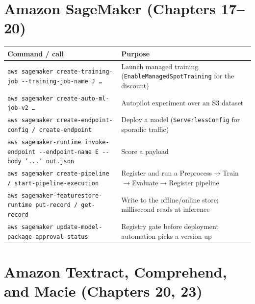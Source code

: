 \section{Amazon SageMaker (Chapters 17--20)}
%

\begin{center}
\footnotesize
\begin{tabular}{@{}p{7.2cm}p{7.6cm}@{}}
\toprule
\textbf{Command / call} & \textbf{Purpose} \\
\midrule
\texttt{aws sagemaker create-training-job -{}-training-job-name J \dots} & Launch managed training (\texttt{EnableManagedSpotTraining} for the discount) \\
\texttt{aws sagemaker create-auto-ml-job-v2 \dots} & Autopilot experiment over an S3 dataset \\
\texttt{aws sagemaker create-endpoint-config / create-endpoint} & Deploy a model (\texttt{ServerlessConfig} for sporadic traffic) \\
\texttt{aws sagemaker-runtime invoke-endpoint -{}-endpoint-name E -{}-body '{...}' out.json} & Score a payload \\
\texttt{aws sagemaker create-pipeline / start-pipeline-execution} & Register and run a Preprocess$\rightarrow$Train$\rightarrow$Evaluate$\rightarrow$Register pipeline \\
\texttt{aws sagemaker-featurestore-runtime put-record / get-record} & Write to the offline/online store; millisecond reads at inference \\
\texttt{aws sagemaker update-model-package-approval-status} & Registry gate before deployment automation picks a version up \\
\bottomrule
\end{tabular}
\end{center}

\section{Amazon Textract, Comprehend, and Macie (Chapters 20, 23)}
%

